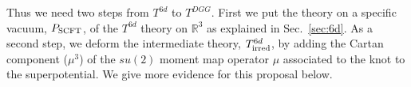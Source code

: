 \documentclass[a4paper,11pt]{article}
\def\cD{\mathcal{D}}
\def\CM{{\cal M}}
\begin{document}
Thus we need two steps from $T^{6d}$ to  $T^{DGG}$. 
First we put the theory on a specific vacuum, $P_{\rm SCFT}$, of the $T^{6d}$ theory on $\mathbb{R}^3$ as explained in Sec.~\ref{sec:6d}. 
%
%
%
As a second step, we  deform the intermediate theory, $T^{6d}_{\rm irred}$, by adding the Cartan component ($\mu^3$) of the $su(2)$ moment map operator 
$\mu$ associated to the knot to the superpotential. We give more evidence for this proposal below.
\end{document}
